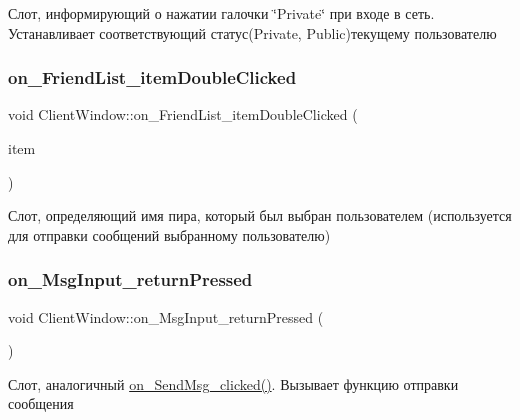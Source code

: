Слот, информирующий о нажатии галочки \char`\"{}\+Private\char`\"{} при входе в сеть. Устанавливает соответствующий статус(\+Private, Public)текущему пользователю 

\mbox{\label{class_client_window_a53683c81555a53e513066619a66bdbf4}} 
\subsubsection{\texorpdfstring{on\+\_\+\+Friend\+List\+\_\+item\+Double\+Clicked}{on\_FriendList\_itemDoubleClicked}}
{\footnotesize\ttfamily void Client\+Window\+::on\+\_\+\+Friend\+List\+\_\+item\+Double\+Clicked (\begin{DoxyParamCaption}\item[{Q\+List\+Widget\+Item $\ast$}]{item }\end{DoxyParamCaption})\hspace{0.3cm}{\ttfamily [slot]}}



Слот, определяющий имя пира, который был выбран пользователем (используется для отправки сообщений выбранному пользователю) 

\mbox{\label{class_client_window_a201f45c14dfb71277f628ea6607d2959}} 
\subsubsection{\texorpdfstring{on\+\_\+\+Msg\+Input\+\_\+return\+Pressed}{on\_MsgInput\_returnPressed}}
{\footnotesize\ttfamily void Client\+Window\+::on\+\_\+\+Msg\+Input\+\_\+return\+Pressed (\begin{DoxyParamCaption}{ }\end{DoxyParamCaption})\hspace{0.3cm}{\ttfamily [slot]}}



Слот, аналогичный \hyperlink{class_client_window_a3868f97e58d97ea716137c52e50b968d}{on\+\_\+\+Send\+Msg\+\_\+clicked()}. Вызывает функцию отправки сообщения 

